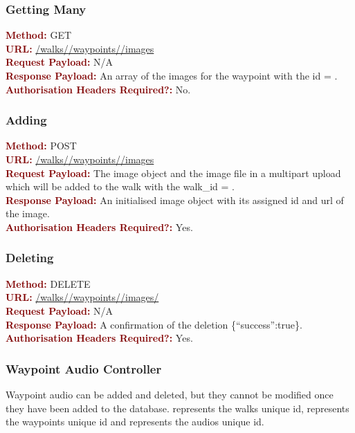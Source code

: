 \documentclass[11pt,a4paper]{report}
\begin{document}
\subsubsection{Getting Many}
\textbf{\textcolor{Maroon}{Method:}} GET\\
\textbf{\textcolor{Maroon}{URL:}} \url{/walks/}\url{/waypoints/}\url{/images}\\
\textbf{\textcolor{Maroon}{Request Payload:}} N/A\\
\textbf{\textcolor{Maroon}{Response Payload:}} An array of the images for the waypoint with the id = .\\
\textbf{\textcolor{Maroon}{Authorisation Headers Required?:}} No.

\subsubsection{Adding}
\textbf{\textcolor{Maroon}{Method:}} POST\\
\textbf{\textcolor{Maroon}{URL:}} \url{/walks/}\url{/waypoints/}\url{/images}\\
\textbf{\textcolor{Maroon}{Request Payload:}} The image object and the image file in a multipart upload which will be added to the walk with the walk\_id = .\\
\textbf{\textcolor{Maroon}{Response Payload:}} An initialised image object with its assigned id and url of the image.\\
\textbf{\textcolor{Maroon}{Authorisation Headers Required?:}} Yes.

\subsubsection{Deleting}
\textbf{\textcolor{Maroon}{Method:}} DELETE\\
\textbf{\textcolor{Maroon}{URL:}} \url{/walks/}\url{/waypoints/}\url{/images/}\\
\textbf{\textcolor{Maroon}{Request Payload:}} N/A\\
\textbf{\textcolor{Maroon}{Response Payload:}} A confirmation of the deletion \{``success'':true\}.\\
\textbf{\textcolor{Maroon}{Authorisation Headers Required?:}} Yes.


\subsubsection{Waypoint Audio Controller}
Waypoint audio can be added and deleted, but they cannot be modified once they have been added to the database.  represents the walks unique id,  represents the waypoints unique id and  represents the audios unique id. 
\end{document}
